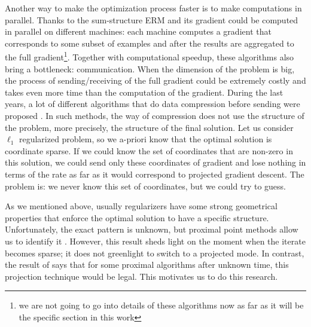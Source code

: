 Another way to make the optimization process faster is to make computations in parallel. Thanks to the sum-structure ERM and its gradient could be computed in parallel on different machines: each machine computes a gradient that corresponds to some subset of examples and after the results are aggregated to the full gradient\footnote{we are not going to go into details of these algorithms now as far as it will be the specific section in this work}. Together with computational speedup, these algorithms also bring a bottleneck: communication. When the dimension of the problem is big, the process of sending/receiving of the full gradient could be extremely costly and takes even more time than the computation of the gradient. During the last years, a lot of different algorithms that do data compression before sending were proposed \cite{alistarh2017qsgd, wangni2018gradient, hubara2017quantized, wang2017efficient}. In such methods, the way of compression does not use the structure of the problem, more precisely, the structure of the final solution. Let us consider $\ell_1$ regularized problem, so we a-priori know that the optimal solution is coordinate sparse. If we could know the set of coordinates that are non-zero in this solution, we could send only these coordinates of gradient and lose nothing in terms of the rate as far as it would correspond to projected gradient descent. The problem is: we never know this set of coordinates, but we could try to guess. 

As we mentioned above, usually regularizers have some strong geometrical properties that enforce the optimal solution to have a specific structure. Unfortunately, the exact pattern is unknown, but proximal point methods allow us to identify it \cite{nutini2019active}. However, this result sheds light on the moment when the iterate becomes sparse; it does not greenlight to switch to a projected mode. In contrast, the result of \cite{fadili2018sensitivity} says that for some proximal algorithms after unknown time, this projection technique would be legal. {This motivates us to do this research.}

